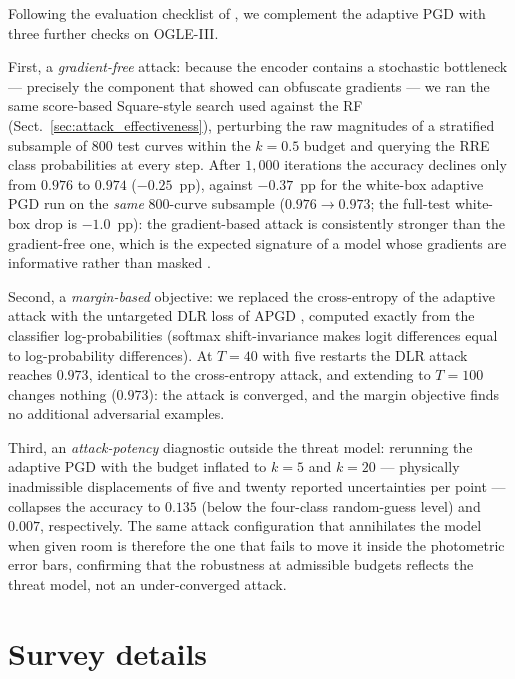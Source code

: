 \documentclass{aa}
\begin{document}
Following the evaluation checklist of \citet{carlini2019evaluating}, we
complement the adaptive PGD with three further checks on OGLE-III.

First, a \emph{gradient-free} attack: because the encoder contains a
stochastic bottleneck --- precisely the component that
\citet{korshunova2021closer} showed can obfuscate gradients --- we ran
the same score-based Square-style search used against the RF
(Sect.~\ref{sec:attack_effectiveness}), perturbing the raw magnitudes of
a stratified subsample of $800$ test curves within the $k=0.5$ budget and
querying the RRE class probabilities at every step. After $1{,}000$
iterations the accuracy declines only from $0.976$ to $0.974$
($-0.25$~pp), against $-0.37$~pp for the white-box adaptive PGD run on
the \emph{same} $800$-curve subsample ($0.976 \to 0.973$; the full-test
white-box drop is $-1.0$~pp): the gradient-based attack is consistently
stronger than the gradient-free one, which is the expected signature of a
model whose gradients are informative rather than masked
\citep{athalye2018obfuscated}.

Second, a \emph{margin-based} objective: we replaced the cross-entropy of
the adaptive attack with the untargeted DLR loss of APGD
\citep{croce2020reliable}, computed exactly from the classifier
log-probabilities (softmax shift-invariance makes logit differences equal
to log-probability differences). At $T=40$ with five restarts the DLR
attack reaches $0.973$, identical to the cross-entropy attack, and
extending to $T=100$ changes nothing ($0.973$): the attack is converged,
and the margin objective finds no additional adversarial examples.

Third, an \emph{attack-potency} diagnostic outside the threat model:
rerunning the adaptive PGD with the budget inflated to $k=5$ and $k=20$
--- physically inadmissible displacements of five and twenty reported
uncertainties per point --- collapses the accuracy to $0.135$ (below the
four-class random-guess level) and $0.007$, respectively. The same attack
configuration that annihilates the model when given room is therefore the
one that fails to move it inside the photometric error bars, confirming
that the robustness at admissible budgets reflects the threat model, not
an under-converged attack.



\section{Survey details}
\label{app:surveys}
\end{document}
